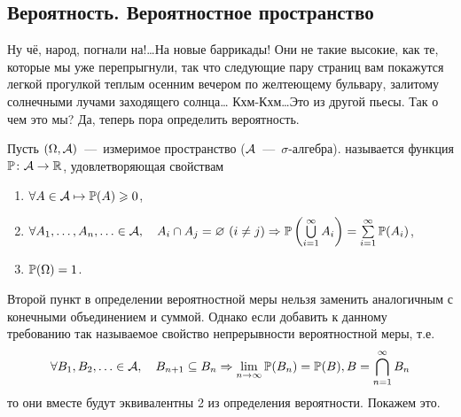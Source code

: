 \documentclass[../TV&MS.tex]{subfiles}
\begin{document}
\subsection{Вероятность. Вероятностное пространство}
	
\qquad Ну чё, народ, погнали на!\dots На новые баррикады! Они не такие высокие, как те, 
которые мы уже перепрыгнули, так что следующие пару страниц вам покажутся легкой прогулкой
теплым осенним вечером по желтеющему бульвару, залитому солнечными лучами заходящего солнца\dots
Кхм-Кхм\dots Это из другой пьесы. Так о чем это мы? Да, теперь пора определить вероятность.

\begin{Def}
    Пусть $(\Omega, \mathcal{A})$~---~измеримое пространство 
    ($\mathcal{A}$~---~$\sigma$-алгебра).
	 называется функция $\mathbb{P} \colon \mathcal{A}\rightarrow \mathbb{R}$, 
	удовлетворяющая свойствам
\begin{enumerate}
	\item $\forall A \in \mathcal{A} \mapsto \mathbb{P} (A) \geqslant 0$,
    \item $\forall A_1, \ldots, A_n, \ldots \in \mathcal{A}, \quad A_i \cap A_j  = \varnothing\  
    (i \not= j)  \Rightarrow \mathbb{P} \left(\bigcup\limits_{i=1}^{\infty} A_i\right) = 
    \sum\limits_{i = 1}^{\infty}\mathbb{P}(A_i)$,
	\item $\mathbb{P} (\Omega) = 1$.
\end{enumerate}
\end{Def}

Второй пункт в определении вероятностной меры нельзя заменить аналогичным с конечными 
объединением и суммой. Однако если добавить к данному требованию так называемое свойство 
непрерывности вероятностной меры, т.е.
$$
	\forall B_1, B_2, \ldots \in \mathcal{A}, \quad B_{n+1} \subseteq B_n 
	\Rightarrow \lim_{n \to \infty} \mathbb{P}(B_n) = \mathbb{P}(B), B = \bigcap_{n=1}^\infty B_n
$$
то они вместе будут эквивалентны 2 из определения вероятности. Покажем это.
\end{document}
